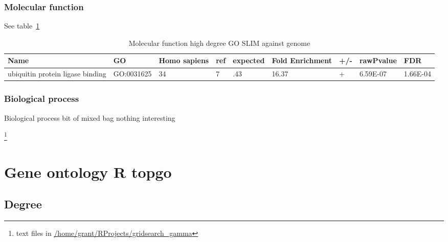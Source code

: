 \subsubsection{Molecular function}
See table~\ref{tab:Molecular function high degree GO SLIM against genome} 
\begin{table}
\centering
\begin{adjustbox}{max width=\textwidth}
\begin{tabular}{lllllllll}
  Name & GO&	Homo sapiens &ref &	expected &	Fold Enrichment &	+/-	&rawPvalue&FDR\\
\hline
ubiquitin protein ligase binding&GO:0031625&	34&	7&	.43&	16.37&	+&	6.59E-07&	1.66E-04\\
\end{tabular}
\end{adjustbox}
\caption{Molecular function high degree GO SLIM against genome}
\label{tab:Molecular function high degree GO SLIM against genome}
\end{table}

\subsubsection{Biological process}
Biological process bit of mixed bag nothing interesting 

\footnote{text files in \url{/home/grant/RProjects/gridsearch_gamma}}

\section{Gene ontology R topgo}
\cite{alexa2009gene}
\subsection{Degree}

